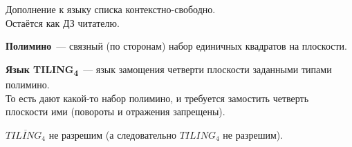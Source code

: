 \documentclass{article}
\begin{document}
    \begin{property}
        Дополнение к языку списка контекстно-свободно.\\
        Остаётся как ДЗ читателю.
    \end{property}
    \begin{definition}
        \textbf{Полимино}~--- связный (по сторонам) набор единичных квадратов на плоскости.
    \end{definition}
    \begin{definition}
        \textbf{Язык TILING\textsubscript{4}}~--- язык замощения четверти плоскости заданными типами полимино.\\
        То есть дают какой-то набор полимино, и требуется замостить четверть плоскости ими (повороты и отражения запрещены).
    \end{definition}
    \begin{property}
        $\overline{TILING_4}$ не разрешим (а следовательно $TILING_4$ не разрешим).
    \end{property}
\end{document}
